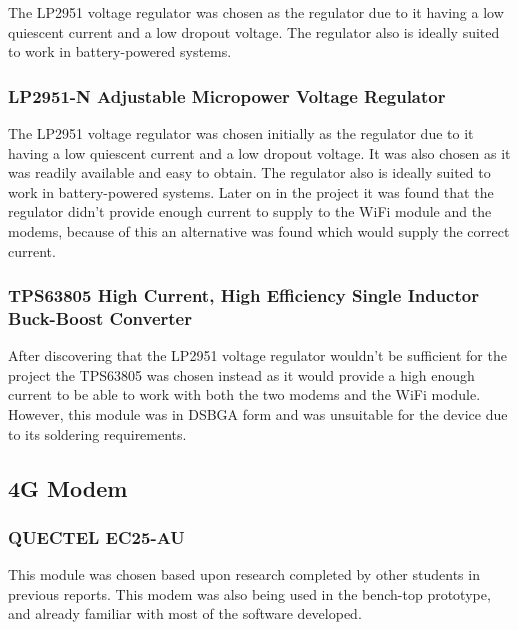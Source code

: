 The LP2951 voltage regulator was chosen as the regulator due to it having a low quiescent current and a low dropout voltage. The regulator also is ideally suited to work in battery-powered systems. 

\subsubsection{LP2951-N Adjustable Micropower Voltage Regulator}

The LP2951 voltage regulator was chosen initially as the regulator due to it having a low quiescent current and a low dropout voltage. 
It was also chosen as it was readily available and easy to obtain. 
The regulator also is ideally suited to work in battery-powered systems. 
Later on in the project it was found that the regulator didn't provide enough current to supply to the WiFi module and the modems, because of this an alternative was found which would supply the correct current.


\subsubsection{TPS63805 High Current, High Efficiency Single Inductor Buck-Boost Converter}

After discovering that the LP2951 voltage regulator wouldn't be sufficient for the project the TPS63805 was chosen instead as it would provide a high enough current to be able to work with both the two modems and the WiFi module. 
However, this module was in DSBGA form and was unsuitable for the device due to its soldering requirements. 



\subsection{4G Modem}
\subsubsection{ QUECTEL EC25-AU}

	This module was chosen based upon research completed by other students in previous reports. 
This modem was also being used in the bench-top prototype, and already familiar with most of the software developed. 

